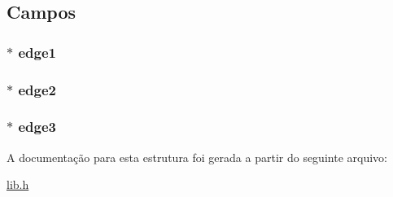 \subsection{Campos}
\subsubsection[{\texorpdfstring{edge1}{edge1}}]{$\ast$ edge1}\hypertarget{structdbEdge_a0886057d00d21df9488a339b5dd15f4a}{}\label{structdbEdge_a0886057d00d21df9488a339b5dd15f4a}
\subsubsection[{\texorpdfstring{edge2}{edge2}}]{$\ast$ edge2}\hypertarget{structdbEdge_a2b83dba0cd9a8636cdb2eee74a1c6573}{}\label{structdbEdge_a2b83dba0cd9a8636cdb2eee74a1c6573}
\subsubsection[{\texorpdfstring{edge3}{edge3}}]{$\ast$ edge3}\hypertarget{structdbEdge_a36b1358ac94b0054e16334e6727b6d2a}{}\label{structdbEdge_a36b1358ac94b0054e16334e6727b6d2a}


A documentação para esta estrutura foi gerada a partir do seguinte arquivo\+:\begin{DoxyCompactItemize}
\item 
\hyperlink{lib_8h}{lib.\+h}\end{DoxyCompactItemize}
